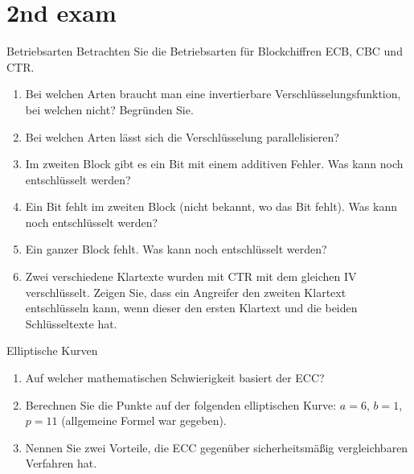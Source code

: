 \documentclass{article}
\begin{document}



\section[2023]{2nd exam}

\begin{exercise}{Betriebsarten}
  Betrachten Sie die Betriebsarten für Blockchiffren ECB, CBC und CTR.

  \begin{enumerate}
    \item Bei welchen Arten braucht man eine invertierbare Verschlüsselungsfunktion, bei welchen nicht? Begründen Sie.
    \item Bei welchen Arten lässt sich die Verschlüsselung parallelisieren?
    \item Im zweiten Block gibt es ein Bit mit einem additiven Fehler. Was kann noch entschlüsselt werden?
    \item Ein Bit fehlt im zweiten Block (nicht bekannt, wo das Bit fehlt). Was kann noch entschlüsselt werden?
    \item Ein ganzer Block fehlt. Was kann noch entschlüsselt werden?
    \item Zwei verschiedene Klartexte wurden mit CTR mit dem gleichen IV verschlüsselt. Zeigen Sie, dass ein Angreifer den zweiten Klartext entschlüsseln kann, wenn dieser den ersten Klartext und die beiden Schlüsseltexte hat.
  \end{enumerate}

  \begin{solution}
  \end{solution}
\end{exercise}

\begin{exercise}{Elliptische Kurven}
  \begin{enumerate}
    \item Auf welcher mathematischen Schwierigkeit basiert der ECC?
    \item Berechnen Sie die Punkte auf der folgenden elliptischen Kurve: $a = 6$, $b = 1$, $p = 11$ (allgemeine Formel war gegeben).
    \item Nennen Sie zwei Vorteile, die ECC gegenüber sicherheitsmäßig vergleichbaren Verfahren hat.
  \end{enumerate}

  \begin{solution}
  \end{solution}
\end{exercise}
\end{document}
